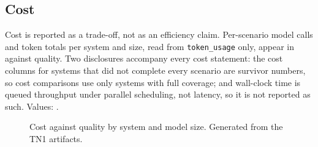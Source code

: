 \subsection{Cost}
\label{sec:cost}

Cost is reported as a trade-off, not as an efficiency claim. Per-scenario model
calls and token totals per system and size, read from \texttt{token\_usage} only,
appear in  against quality. Two disclosures accompany every
cost statement: the cost columns for systems that did not complete every scenario
are survivor numbers, so cost comparisons use only systems with full coverage; and
wall-clock time is queued throughput under parallel scheduling, not latency, so it
is not reported as such. Values: \TBD.

\begin{figure}[t]
  \centering
  \caption{Cost against quality by system and model size. Generated from the TN1
  artifacts.}
  \label{fig:cost-quality}
\end{figure}

